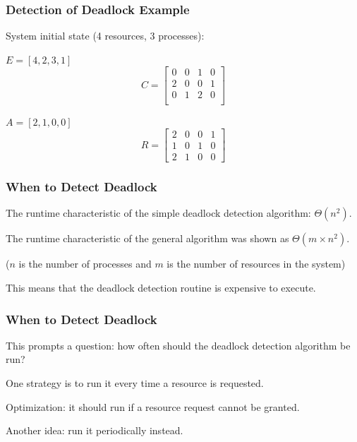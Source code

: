 \begin{frame}
\frametitle{Detection of Deadlock Example}
System initial state (4 resources, 3 processes):

\begin{multicols}{2}
\begin{center}
$E = [4, 2, 3, 1]$
\[ C =
\left[ {\begin{array}{cccc}
0 & 0 & 1 & 0\\
2 & 0 & 0 & 1\\
0 & 1 & 2 & 0\\
\end{array} } \right]
\]
\end{center}
\columnbreak

\begin{center}
$A = [2, 1, 0, 0]$
\[ R =
\left[ {\begin{array}{cccc}
2 & 0 & 0 & 1\\
1 & 0 & 1 & 0\\
2 & 1 & 0 & 0
\end{array} } \right]
\]
\end{center}

\end{multicols}


\end{frame}

\begin{frame}
\frametitle{When to Detect Deadlock}

The runtime characteristic of the simple deadlock detection algorithm: $\Theta(n^{2})$. 

The runtime characteristic of the general algorithm was shown as $\Theta(m \times n^{2})$.

($n$ is the number of processes and $m$ is the number of resources in the system) 

This means that the deadlock detection routine is expensive to execute.


\end{frame}

\begin{frame}
\frametitle{When to Detect Deadlock}

This prompts a question: how often should the deadlock detection algorithm be run? 

One strategy is to run it every time a resource is requested. 

Optimization: it should run if a resource request cannot be granted.

Another idea: run it periodically instead.

\end{frame}

